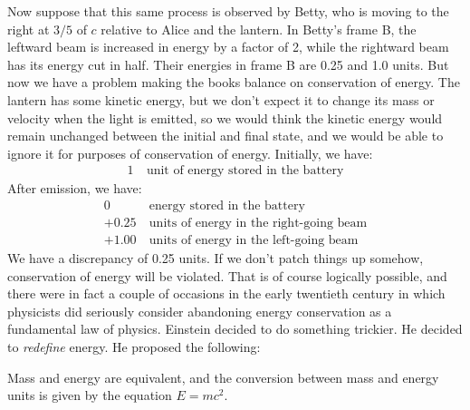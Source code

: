 
Now suppose that this same process is observed by Betty, who is moving to the right at $3/5$ of $c$ relative to
Alice and the lantern. In Betty's frame B, the leftward beam is increased in energy by a factor of 2, while the
rightward beam has its energy cut in half. Their energies in frame B are 0.25 and 1.0 units.
But now we have a problem making the books balance on conservation of energy.
The lantern has some kinetic energy, but we don't expect it to change its mass or velocity when the light is
emitted, so we would think the kinetic energy would remain unchanged between the initial and final state, and we
would be able to ignore it for purposes of conservation of energy. Initially, we have:
\begin{align*}
  1&\ \text{unit of energy stored in the battery}
\end{align*}
After emission, we have:
\begin{align*}
   0&\ \text{energy stored in the battery} \\
  +0.25&\ \text{units of energy in the right-going beam} \\
  +1.00&\ \text{units of energy in the left-going beam} 
\end{align*}
We have a discrepancy of 0.25 units. If we don't patch things up somehow, conservation of energy will be violated.
That is of course logically possible, and there were in fact a couple of occasions in the early twentieth century
in which physicists did seriously consider abandoning energy conservation as a fundamental law of physics.
Einstein decided to do something trickier. He decided to \emph{redefine} energy. He proposed the following:

\begin{important}
Mass and energy are equivalent, and the conversion between mass and energy units is given by the equation $E=mc^2$.
\end{important}

